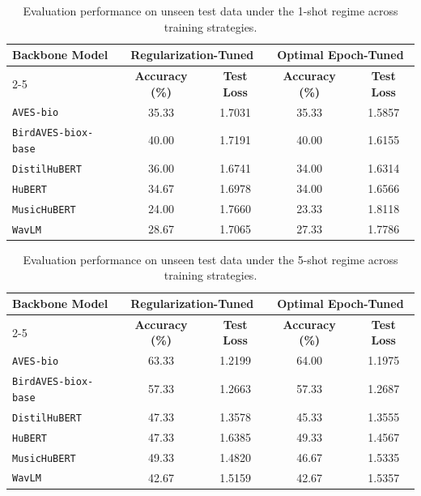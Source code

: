 \begin{table}[htbp]
\centering
\caption{Evaluation performance on unseen test data under the 1-shot regime across training strategies.}
\label{tab:eval_performance_1_shot}
\begin{tabular}{lcccc}
\hline
\textbf{Backbone Model} & \multicolumn{2}{c}{\textbf{Regularization-Tuned}} & \multicolumn{2}{c}{\textbf{Optimal Epoch-Tuned}} \\
\cline{2-5}
& \textbf{Accuracy (\%)} & \textbf{Test Loss} & \textbf{Accuracy (\%)} & \textbf{Test Loss} \\
\hline
\texttt{AVES-bio} & 35.33 & 1.7031 & 35.33 & 1.5857 \\
\texttt{BirdAVES-biox-base} & 40.00 & 1.7191 & 40.00 & 1.6155 \\
\texttt{DistilHuBERT} & 36.00 & 1.6741 & 34.00 & 1.6314 \\
\texttt{HuBERT} & 34.67 & 1.6978 & 34.00 & 1.6566 \\
\texttt{MusicHuBERT} & 24.00 & 1.7660 & 23.33 & 1.8118 \\
\texttt{WavLM} & 28.67 & 1.7065 & 27.33 & 1.7786 \\
\hline
\end{tabular}
\end{table}


\begin{table}[htbp]
\centering
\caption{Evaluation performance on unseen test data under the 5-shot regime across training strategies.}
\label{tab:eval_performance_5_shot}
\begin{tabular}{lcccc}
\hline
\textbf{Backbone Model} & \multicolumn{2}{c}{\textbf{Regularization-Tuned}} & \multicolumn{2}{c}{\textbf{Optimal Epoch-Tuned}} \\
\cline{2-5}
& \textbf{Accuracy (\%)} & \textbf{Test Loss} & \textbf{Accuracy (\%)} & \textbf{Test Loss} \\
\hline
\texttt{AVES-bio} & 63.33 & 1.2199 & 64.00 & 1.1975 \\
\texttt{BirdAVES-biox-base} & 57.33 & 1.2663 & 57.33 & 1.2687 \\
\texttt{DistilHuBERT} & 47.33 & 1.3578 & 45.33 & 1.3555 \\
\texttt{HuBERT} & 47.33 & 1.6385 & 49.33 & 1.4567 \\
\texttt{MusicHuBERT} & 49.33 & 1.4820 & 46.67 & 1.5335 \\
\texttt{WavLM} & 42.67 & 1.5159 & 42.67 & 1.5357 \\
\hline
\end{tabular}
\end{table}


